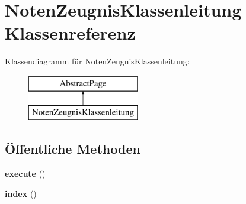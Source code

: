 \hypertarget{class_noten_zeugnis_klassenleitung}{}\section{Noten\+Zeugnis\+Klassenleitung Klassenreferenz}
\label{class_noten_zeugnis_klassenleitung}
Klassendiagramm für Noten\+Zeugnis\+Klassenleitung\+:\begin{figure}[H]
\begin{center}
\leavevmode
\includegraphics[height=2.000000cm]{class_noten_zeugnis_klassenleitung}
\end{center}
\end{figure}
\subsection*{Öffentliche Methoden}
\begin{DoxyCompactItemize}
\item 
\mbox{\label{class_noten_zeugnis_klassenleitung_a9ce203e3085018afe24fd1562da7ba11}} 
{\bfseries execute} ()
\item 
\mbox{\label{class_noten_zeugnis_klassenleitung_aca064af02a687562bde050657088ddaa}} 
{\bfseries index} ()
\end{DoxyCompactItemize}
